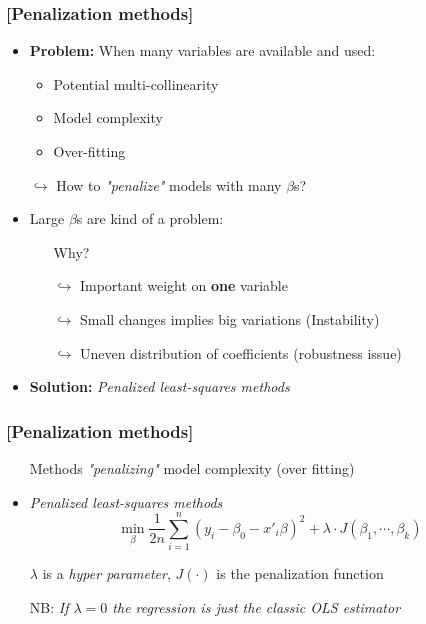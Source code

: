 \documentclass[xcolor=x11names,compress]{beamer}
\renewcommand{\(}{\begin{columns}}
\renewcommand{\)}{\end{columns}}
\newcommand{\<}[1]{\begin{column}{#1}}
\renewcommand{\>}{\end{column}}
\begin{document}
\begin{frame} %
\frametitle{\textcolor{brique}{[Penalization methods]}}
\pause
\begin{itemize}[<+->]
\item \textbf{Problem:} When many variables are available and used:
 \begin{itemize}[<+->]
        \item Potential multi-collinearity
        \item Model complexity
        \item Over-fitting
    \end{itemize}
\item[$\hookrightarrow$]  How to \emph{"penalize"} models with many $\beta$s?
\item Large $\beta$s are kind of a problem:
    \begin{itemize}[<+->]
            \item[]\begin{center} \large{ Why?} \end{center}
            \item[$\hookrightarrow$] Important weight on \textbf{one} variable
            \item[$\hookrightarrow$] Small changes implies big variations (Instability)
            \item[$\hookrightarrow$] Uneven distribution of coefficients (robustness issue)
        \end{itemize}
\item \textbf{Solution:}  \textit{ Penalized least-squares methods}
\end{itemize}
\end{frame}


\begin{frame} %
\frametitle{\textcolor{brique}{[Penalization methods]}}
\pause
\begin{itemize}[<+->]
\item[]  Methods  \emph{"penalizing"} model complexity (over fitting)
\item \textit{ Penalized least-squares methods}$$
\min_{\beta} \frac{1}{2n}
     \sum_{i=1}^{n}{ \left( y_i - \beta_0 - x'_i\beta\right)^{2} } +
\lambda \cdot J(\beta_1, \cdots, \beta_k)
$$
\item[] $\lambda$ is a \textit{hyper parameter}, $J(\cdot)$ is the penalization function
\item[NB:] \textit{If $\lambda = 0$ the regression is just the classic OLS estimator}
\end{itemize}
\end{frame}
\end{document}
